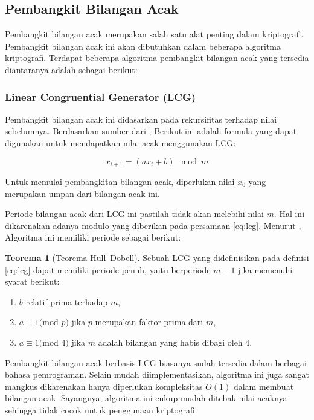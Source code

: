 \documentclass[10pt,conference]{IEEEtran}
\theoremstyle{definition}
\newtheorem{theorem}{Teorema}[section]
\begin{document}
\subsection{Pembangkit Bilangan Acak}
Pembangkit bilangan acak merupakan salah satu alat penting dalam kriptografi. Pembangkit bilangan acak ini akan dibutuhkan dalam beberapa algoritma kriptografi. Terdapat beberapa algoritma pembangkit bilangan acak yang tersedia diantaranya adalah sebagai berikut:

\subsubsection{Linear Congruential Generator (LCG)}

Pembangkit bilangan acak ini didasarkan pada rekursifitas terhadap nilai sebelumnya. Berdasarkan sumber dari \cite{b1}, Berikut ini adalah formula yang dapat digunakan untuk mendapatkan nilai acak menggunakan LCG:

\begin{equation} \label{eq:lcg}
    x_{i+1} = (ax_i + b) \mod m
\end{equation}

Untuk memulai pembangkitan bilangan acak, diperlukan nilai $x_0$ yang merupakan umpan dari bilangan acak ini.

Periode bilangan acak dari LCG ini pastilah tidak akan melebihi nilai $m$. Hal ini dikarenakan adanya modulo yang diberikan pada persamaan \ref{eq:lcg}. Menurut \cite{a1}, Algoritma ini memiliki periode sebagai berikut:

\begin{theorem}[Teorema Hull–Dobell] \label{theo:hulldobell}
    Sebuah LCG yang didefinisikan pada definisi \ref{eq:lcg} dapat memiliki periode penuh, yaitu berperiode $m-1$ jika memenuhi syarat berikut:
    \begin{enumerate}
        \item $b$ relatif prima terhadap $m$,
        \item $a \equiv 1 \text{(mod }p\text{)}$ jika $p$ merupakan faktor prima dari $m$,
        \item $a \equiv 1 \text{(mod }4\text{)}$ jika $m$ adalah bilangan yang habis dibagi oleh 4.
    \end{enumerate}
\end{theorem}

Pembangkit bilangan acak berbasis LCG biasanya sudah tersedia  dalam berbagai bahasa pemrograman. Selain mudah diimplementasikan, algoritma ini juga sangat mangkus dikarenakan hanya diperlukan kompleksitas $O(1)$ dalam membuat bilangan acak. Sayangnya, algoritma ini cukup mudah ditebak nilai acaknya sehingga tidak cocok untuk penggunaan kriptografi. \cite{b1}
\end{document}
